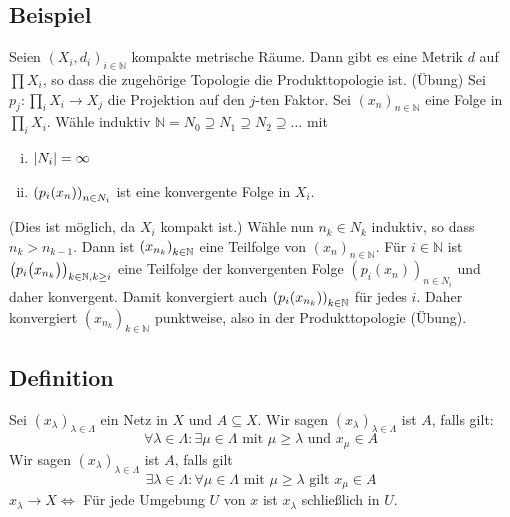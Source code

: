 \subsection[Beispiel: Metrik auf dem Produkt metrischer Räume, die Produkttopologie induziert]{Beispiel} %
\label{sub:48}
Seien $(X_i, d_i)_{i \in \mathds{N}}$ kompakte metrische Räume. Dann gibt es eine Metrik $d$ auf $\prod X_i$, so dass die zugehörige Topologie die Produkttopologie ist.
(Übung)
Sei $p_j : \prod_i X_i \to X_j$ die Projektion auf den $j$-ten Faktor. Sei $(x_n)_{n \in \mathds{N}}$ eine Folge in $\prod_i X_i$. Wähle induktiv 
$\mathds{N}= N_0 \supseteq N_1 \supseteq N_2 \supseteq \ldots $ mit 
\begin{enumerate}[(i)]
	\item $\abs*{N_i} = \infty $
	\item $\enbrace*{p_i(x_n)}_{n \in N_i} $ ist eine konvergente Folge in $X_i$.
\end{enumerate}
(Dies ist möglich, da $X_i$ kompakt ist.) Wähle nun $n_k \in N_k$ induktiv, so dass $n_k > n_{k-1}$. Dann ist $\enbrace*{x_{n_k}}_{k \in \mathds{N}} $ eine Teilfolge von
$(x_n)_{n \in \mathds{N}}$. Für $i \in \mathds{N}$ ist $\enbrace*{p_i\enbrace[\big]{x_{n_k}}}_{k \in \mathds{N}, k \ge i}$ eine Teilfolge der konvergenten Folge 
$(p_i(x_n))_{n \in N_i}$ und daher konvergent. Damit konvergiert auch $\enbrace*{p_i \enbrace*{x_{n_k}} }_{k \in \mathds{N}} $ für jedes $i$. Daher konvergiert 
$(x_{n_k})_{k \in \mathds{N}}$ punktweise, also in der Produkttopologie (Übung). \bewende
 
\subsection[Definition: Netze immer wieder und schließlich in $A$]{Definition} %
\label{sub:49}
Sei $(x_\lambda)_{\lambda  \in \Lambda}$ ein Netz in $X$ und $A \subseteq X$. Wir sagen $(x_\lambda )_{\lambda  \in \Lambda}$ ist  $A$, falls gilt:
\[
	\forall \lambda \in \Lambda : \exists \mu \in \Lambda \text{ mit } \mu \ge \lambda \text{ und } x_\mu \in A
\]  
Wir sagen $(x_\lambda )_{\lambda  \in \Lambda}$ ist  $A$, falls gilt 
\[
	\exists \lambda  \in \Lambda : \forall \mu \in \Lambda \text{ mit } \mu \ge \lambda \text{ gilt } x_\mu \in A
\] 
$x_\lambda  \to X \iff$ Für jede Umgebung $U$ von $x$ ist $x_\lambda $ schließlich in $U$.

